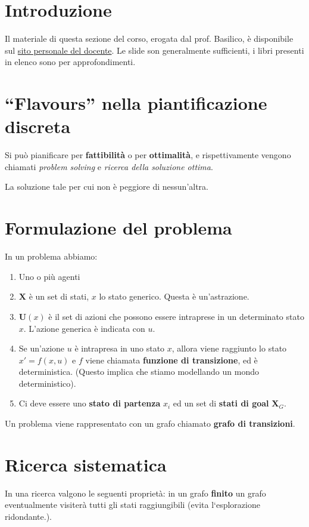 \documentclass[\main/main.tex]{subfiles}
\begin{document}
\section{Introduzione}
Il materiale di questa sezione del corso, erogata dal prof. Basilico, è disponibile sul \href{http://teaching.basilico.di.unimi.it/doku.php/pub/sistemi-intelligenti-2017-2018}{sito personale del docente}. Le slide son generalmente sufficienti, i libri presenti in elenco sono per approfondimenti.

\section{``Flavours'' nella piantificazione discreta}
Si può pianificare per \textbf{fattibilità} o per \textbf{ottimalità}, e rispettivamente vengono chiamati \textit{problem solving} e \textit{ricerca della soluzione ottima}.

\begin{definition}
  La soluzione tale per cui non è peggiore di nessun'altra.
\end{definition}

\section{Formulazione del problema}
In un problema abbiamo:

\begin{enumerate}
  \item Uno o più agenti
  \item $\bm{X}$ è un set di stati, $x$ lo stato generico. Questa è un'astrazione.
  \item $\bm{U}(x)$ è il set di azioni che possono essere intraprese in un determinato stato $x$. L'azione generica è indicata con $u$.
  \item Se un'azione $u$ è intrapresa in uno stato $x$, allora viene raggiunto lo stato $x' = f(x,u)$ e $f$ viene chiamata \textbf{funzione di transizione}, ed è deterministica. (Questo implica che stiamo modellando un mondo deterministico).
  \item Ci deve essere uno \textbf{stato di partenza} $x_i$ ed un set di \textbf{stati di goal} $\bm{X}_G$.
\end{enumerate}

Un problema viene rappresentato con un grafo chiamato \textbf{grafo di transizioni}.

\section{Ricerca sistematica}
In una ricerca valgono le seguenti proprietà: in un grafo \textbf{finito} un grafo eventualmente visiterà tutti gli stati raggiungibili (evita l`esplorazione ridondante.).
\end{document}
